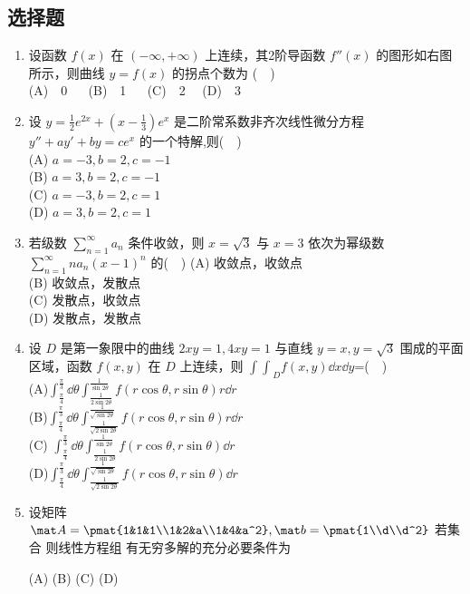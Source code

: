 \subsection{选择题}
\begin{enumerate}($\quad$)
\item 设函数 $f(x)$ 在 $(-\infty,+\infty)$ 上连续，其2阶导函数 $f''(x)$  的图形如右图所示，则曲线 $y=f(x)$ 的拐点个数为 ($\quad$)\\
(A)$\quad$0  $\quad$  (B)$\quad$1 $\quad$  (C)$\quad$2  $\quad$(D)$\quad$3 
\item 设 $y=\frac{1}{2}e^{2x}+(x-\frac{1}{3})e^x$ 是二阶常系数非齐次线性微分方程 $y''+ay'+by=ce^x$  的一个特解,则($\quad$)\\
(A) $a=-3,b=2,c=-1$\\
(B) $a=3,b=2,c=-1$\\
(C) $a=-3,b=2,c=1$\\
(D) $a=3,b=2,c=1$
\item 若级数 $\displaystyle \sum_{n=1}^\infty a_n $ 条件收敛，则 $x=\sqrt{3}$ 与 $x=3$  依次为幂级数 $\displaystyle \sum_{n=1}^\infty na_n(x-1)^n$  的($\quad$)
(A) 收敛点，收敛点\\
(B) 收敛点，发散点\\
(C) 发散点，收敛点\\
(D) 发散点，发散点
\item  设 $D$ 是第一象限中的曲线 $2xy=1,4xy=1$   与直线 $y=x,y=\sqrt{3}$  围成的平面区域，函数 $f(x,y)$   在 $D$ 上连续，则 $\displaystyle {\int \int}_D f(x,y)\dd{x}\dd{y}$=($\quad$)\\
(A)$\displaystyle  \int_\frac{\pi}{4}^\frac{\pi}{3}\dd{\theta}\int_\frac{1}{2\sin 2\theta}^\frac{1}{\sin 2\theta}f(r\cos \theta,r\sin \theta)r\dd{r}$\\
(B)$\displaystyle  \int_\frac{\pi}{4}^\frac{\pi}{3}\dd{\theta}\int_\frac{1}{\sqrt{2\sin 2\theta}}^\frac{1}{\sqrt{\sin 2\theta}}f(r\cos \theta,r\sin \theta)r\dd{r}$\\
(C) $\displaystyle  \int_\frac{\pi}{4}^\frac{\pi}{3}\dd{\theta}\int_\frac{1}{2\sin 2\theta}^\frac{1}{\sin 2\theta}f(r\cos \theta,r\sin \theta)\dd{r}$\\
(D)$\displaystyle  \int_\frac{\pi}{4}^\frac{\pi}{3}\dd{\theta}\int_\frac{1}{\sqrt{2\sin 2\theta}}^\frac{1}{\sqrt{\sin 2\theta}}f(r\cos \theta,r\sin \theta)\dd{r}$
\item 设矩阵 $\mat A=\pmat{1&1&1\\1&2&a\\1&4&a^2},\mat b=\pmat{1\\d\\d^2}$  若集合  则线性方程组   有无穷多解的充分必要条件为


(A) 
(B)
(C) 
(D)
\end{enumerate}